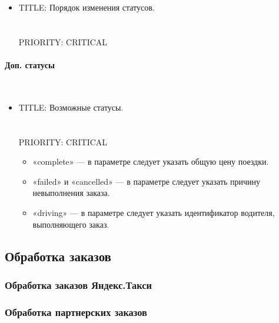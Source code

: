 \begin{itemize}
           			\item{

           				TITLE: Порядок изменения статусов.\\
           				\\
           				\\
           				PRIORITY: CRITICAL

           			}

           		\end{itemize} 

            \paragraph{Доп. статусы} \mbox{} \label{extra_order_status_for_agg} \\

            	\begin{itemize}

	            	\item {

	           				TITLE: Возможные статусы.\\
	           				\\
	           				\\
	           				PRIORITY: CRITICAL
	           			}

	           		\begin{itemize}
	           					
	           					\item{«complete» — в параметре следует указать общую цену поездки.}

	           					\item{«failed» и «cancelled» — в параметре следует указать причину невыполнения заказа.}

	           					\item{«driving» — в параметре следует указать идентификатор водителя, выполняющего заказ.}

	           		\end{itemize}

           		\end{itemize}

	\subsection{Обработка заказов}

		\subsubsection{Обработка заказов Яндекс.Такси}

		\subsubsection{Обработка партнерских заказов}
